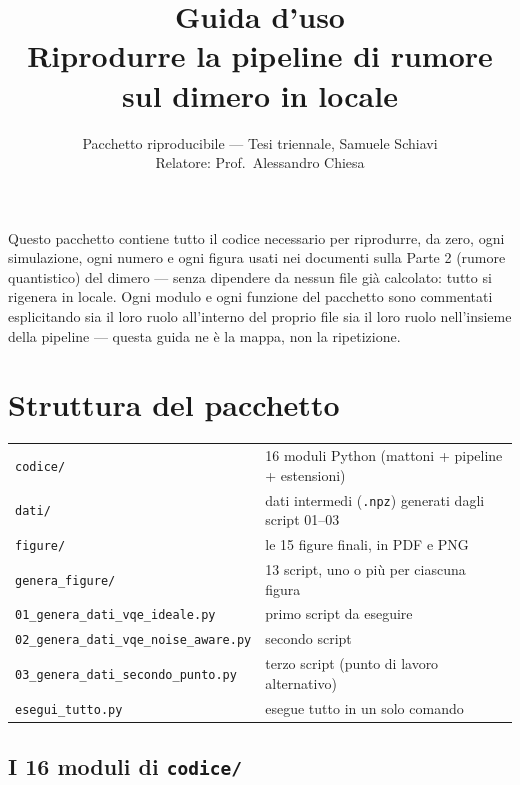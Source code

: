 \documentclass[11pt,a4paper]{article}
\title{\vspace{-1.5em}\color{inkblue}Guida d'uso\\[0.2em]
\Large\normalfont\color{softgray}Riprodurre la pipeline di rumore sul dimero in locale}
\author{Pacchetto riproducibile --- Tesi triennale, Samuele Schiavi\\ Relatore: Prof.\ Alessandro Chiesa}
\date{}
\newcommand{\code}[1]{\texttt{\small #1}}
\begin{document}
\sloppy
\maketitle
\thispagestyle{fancy}
\vspace{-2.0em}

Questo pacchetto contiene tutto il codice necessario per riprodurre, da
zero, ogni simulazione, ogni numero e ogni figura usati nei documenti
sulla Parte 2 (rumore quantistico) del dimero --- senza dipendere da
nessun file già calcolato: tutto si rigenera in locale. Ogni modulo e
ogni funzione del pacchetto sono commentati esplicitando sia il loro
ruolo all'interno del proprio file sia il loro ruolo nell'insieme della
pipeline --- questa guida ne è la mappa, non la ripetizione.

\tableofcontents

\section{Struttura del pacchetto}

\begin{keyeq}
\centering
\begin{tabular}{@{}ll@{}}
\code{codice/} & 16 moduli Python (mattoni + pipeline + estensioni)\\
\code{dati/} & dati intermedi (\code{.npz}) generati dagli script 01--03\\
\code{figure/} & le 15 figure finali, in PDF e PNG\\
\code{genera\_figure/} & 13 script, uno o più per ciascuna figura\\
\code{01\_genera\_dati\_vqe\_ideale.py} & primo script da eseguire\\
\code{02\_genera\_dati\_vqe\_noise\_aware.py} & secondo script\\
\code{03\_genera\_dati\_secondo\_punto.py} & terzo script (punto di lavoro alternativo)\\
\code{esegui\_tutto.py} & esegue tutto in un solo comando\\
\end{tabular}
\end{keyeq}

\subsection{I 16 moduli di \texttt{codice/}}
\end{document}
